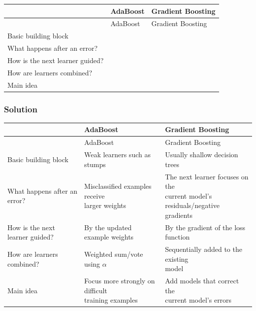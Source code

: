 \documentclass[10pt]{article}
\begin{document}
\begingroup
\small
\setlength{\tabcolsep}{4pt}
\begin{longtable}{l|l|l}
\rule{0pt}{2.4ex} & AdaBoost & Gradient Boosting \\[3pt]
\hline
\endfirsthead
\rule{0pt}{2.4ex} & AdaBoost & Gradient Boosting \\[3pt]
\hline
\endhead
\rule{0pt}{2.4ex}Basic building block &  $\phantom{-0.00}$ &  $\phantom{-0.00}$ \\[3pt]
\rule{0pt}{2.4ex}What happens after an error? &  $\phantom{-0.00}$ &  $\phantom{-0.00}$ \\[3pt]
\rule{0pt}{2.4ex}How is the next learner guided? &  $\phantom{-0.00}$ &  $\phantom{-0.00}$ \\[3pt]
\rule{0pt}{2.4ex}How are learners combined? &  $\phantom{-0.00}$ &  $\phantom{-0.00}$ \\[3pt]
\rule{0pt}{2.4ex}Main idea &  $\phantom{-0.00}$ &  $\phantom{-0.00}$ \\[3pt]
\end{longtable}
\endgroup
\begingroup\color{red}

\subsubsection*{Solution}
\begingroup
\small
\setlength{\tabcolsep}{4pt}
\begin{longtable}{l|l|l}
\rule{0pt}{2.4ex} & AdaBoost & Gradient Boosting \\[3pt]
\hline
\endfirsthead
\rule{0pt}{2.4ex} & AdaBoost & Gradient Boosting \\[3pt]
\hline
\endhead
Basic building block & Weak learners such as stumps & Usually shallow decision trees \\[1.5pt]
What happens after an error? & \shortstack[l]{Misclassified examples receive \\ larger weights} & \shortstack[l]{The next learner focuses on the \\ current model's residuals/negative \\ gradients} \\[1.5pt]
How is the next learner guided? & By the updated example weights & \shortstack[l]{By the gradient of the loss \\ function} \\[1.5pt]
How are learners combined? & Weighted sum/vote using $\alpha$ & \shortstack[l]{Sequentially added to the existing \\ model} \\[1.5pt]
Main idea & \shortstack[l]{Focus more strongly on difficult \\ training examples} & \shortstack[l]{Add models that correct the \\ current model's errors} \\[1.5pt]
\end{longtable}
\endgroup
\par\endgroup
\end{document}
